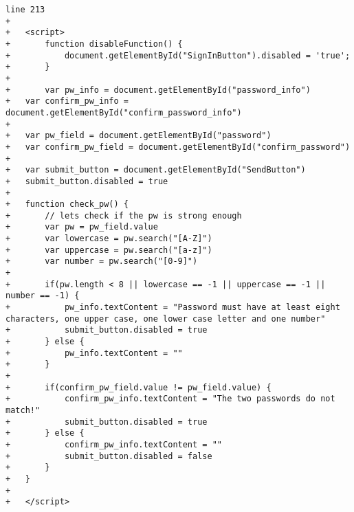 \begin{lstlisting}[caption = pw\_recovery.php]
line 213
+
+	<script>
+		function disableFunction() {
+		    document.getElementById("SignInButton").disabled = 'true';
+		}
+		
+		var pw_info = document.getElementById("password_info")
+	var confirm_pw_info = document.getElementById("confirm_password_info")
+	
+	var pw_field = document.getElementById("password")
+	var confirm_pw_field = document.getElementById("confirm_password")
+	
+	var submit_button = document.getElementById("SendButton")
+	submit_button.disabled = true
+	
+	function check_pw() {
+		// lets check if the pw is strong enough
+		var pw = pw_field.value
+		var lowercase = pw.search("[A-Z]")
+		var uppercase = pw.search("[a-z]")
+		var number = pw.search("[0-9]")
+		
+		if(pw.length < 8 || lowercase == -1 || uppercase == -1 || number == -1) {
+			pw_info.textContent = "Password must have at least eight characters, one upper case, one lower case letter and one number"
+			submit_button.disabled = true
+		} else {
+			pw_info.textContent = ""
+		}
+	
+		if(confirm_pw_field.value != pw_field.value) {
+			confirm_pw_info.textContent = "The two passwords do not match!"
+			submit_button.disabled = true
+		} else {
+			confirm_pw_info.textContent = ""
+			submit_button.disabled = false
+		}
+	}
+
+	</script>
\end{lstlisting}